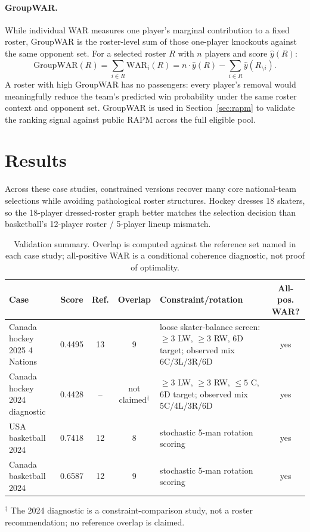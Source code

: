 \documentclass[11pt,letterpaper]{article}
\begin{document}
\paragraph{GroupWAR.} While individual WAR measures one player's
marginal contribution to a fixed roster, GroupWAR is the roster-level
sum of those one-player knockouts against the same opponent set. For a
selected roster $R$ with $n$ players and score $\hat{y}(R)$:
\[
  \mathrm{GroupWAR}(R) = \sum_{i \in R} \mathrm{WAR}_i(R)
  = n\cdot\hat{y}(R) - \sum_{i \in R}\hat{y}(R_{\setminus i}).
\]
A roster with high GroupWAR has no passengers: every player's removal
would meaningfully reduce the team's predicted win probability under
the same roster context and opponent set. GroupWAR is used in
Section~\ref{sec:rapm} to validate the ranking signal against public
RAPM across the full eligible pool.

\section{Results}
\label{sec:results}

Across these case studies, constrained versions recover many core
national-team selections while avoiding pathological roster structures.
Hockey dresses 18 skaters, so the 18-player dressed-roster graph better
matches the selection decision than basketball's 12-player roster /
5-player lineup mismatch.

\begin{table}[h]
  \centering
  \scriptsize
  \caption{Validation summary. Overlap is computed against the
    reference set named in each case study; all-positive WAR is a
    conditional coherence diagnostic, not proof of optimality.}
  \begin{tabular}{@{}l c c c p{5.0cm} c@{}}
    \toprule
    Case & Score & Ref. & Overlap & Constraint/rotation & All-pos. WAR? \\
    \midrule
    Canada hockey 2025 4 Nations & 0.4495 & 13 & 9 & loose skater-balance screen: $\geq 3$ LW, $\geq 3$ RW, 6D target; observed mix 6C/3L/3R/6D & yes \\
    Canada hockey 2024 diagnostic & 0.4428 & -- & not claimed$^\dagger$ & $\geq 3$ LW, $\geq 3$ RW, $\leq 5$ C, 6D target; observed mix 5C/4L/3R/6D & yes \\
    USA basketball 2024 & 0.7418 & 12 & 8 & stochastic 5-man rotation scoring & yes \\
    Canada basketball 2024 & 0.6587 & 12 & 9 & stochastic 5-man rotation scoring & yes \\
    \bottomrule
  \end{tabular}
  \par\smallskip
  {\scriptsize $^\dagger$ The 2024 diagnostic is a constraint-comparison study, not a roster
  recommendation; no reference overlap is claimed.}
\end{table}
\end{document}
